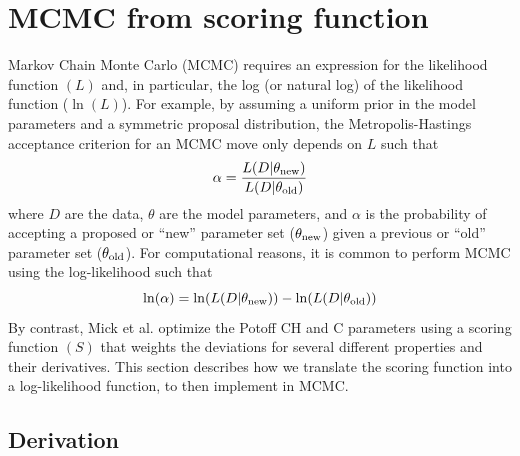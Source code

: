\documentclass[preprint,review,11pt]{elsarticle}
\begin{document}
    \clearpage
	\newpage
	
	\section{MCMC from scoring function} \label{SI:MCMC from scoring function}
	
	Markov Chain Monte Carlo (MCMC) requires an expression for the likelihood function $(L)$ and, in particular, the log (or natural log) of the likelihood function ($\ln(L)$). For example, by assuming a uniform prior in the model parameters and a symmetric proposal distribution, the Metropolis-Hastings acceptance criterion for an MCMC move only depends on $L$ such that
	\begin{equation}
	\alpha = \frac{L(D|\theta_{\rm new})}{L(D|\theta_{\rm old})}
	\end{equation}
	where $D$ are the data, $\theta$ are the model parameters, and $\alpha$ is the probability of accepting a proposed or ``new'' parameter set ($\theta_{\rm new}$) given a previous or ``old'' parameter set ($\theta_{\rm old}$). For computational reasons, it is common to perform MCMC using the log-likelihood such that 
	\begin{equation} \label{eq:log-alpha}
	\ln(\alpha) = \ln(L(D|\theta_{\rm new})) - \ln(L(D|\theta_{\rm old}))
	\end{equation}
	By contrast, Mick et al. optimize the Potoff CH and C parameters using a scoring function $(S)$ that weights the deviations for several different properties and their derivatives. This section describes how we translate the scoring function into a log-likelihood function, to then implement in MCMC.
	
	\subsection{Derivation}
		
\end{document}
